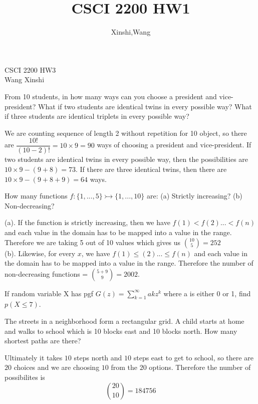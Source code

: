 \documentclass{article}
\title{CSCI 2200 HW1}
\author{Xinshi,Wang}
\begin{document}
\noindent
CSCI 2200 HW3\\
Wang Xinshi\\

\begin{addmargin}[2em]{2em}
	From 10 students, in how many ways can you choose a president and vice-president? What if two students are identical twins in every possible way? What if three students are identical triplets in every possible way?
	\vspace{1.5em}
	
	We are counting sequence of length 2 without repetition for 10 object, so there are $\dfrac{10!}{(10-2)!} = 10 \times 9 = 90$ ways of choosing a president and vice-president. If two students are identical twins in every possible way, then the possibilities are $10 \times 9 - (9+8) = 73$. If there are three identical twins, then there are $10 \times 9 - (9+8+9) = 64 $ ways. 
\end{addmargin}

\clearpage

\begin{addmargin}[2em]{2em}
	 How many functions $f : \{1, . . . , 5\} \rightarrowtail \{1, . . . , 10\}$ are: (a) Strictly increasing? (b) Non-decreasing?
	\vspace{1.5em}
	
	(a). If the function is strictly increasing, then we have $f(1)<f(2)...<f(n)$ and each value in the domain has to be mapped into a value in the range. Therefore we are taking 5 out of 10 values which gives us $\binom{10}{5} = 252$\\
	\indent	(b). Likewise, for every $x$,  we have $f(1)\leq(2)...\leq f(n)$ and each value in the domain has to be mapped into a value in the range. Therefore the number of non-decreasing functions = $\binom{5+9}{9} = 2002$.\\
\end{addmargin}

If random variable X has pgf $G(z) = \sum_{k=1}^{\infty} akz^k$ where a is either 0 or 1, find $p({X \leq 7})$.
\clearpage

\begin{addmargin}[2em]{2em}
The streets in a neighborhood form a rectangular grid. A child starts at home and walks to school which is 10 blocks east and 10 blocks north. How many shortest paths are there?
\vspace{1.5em}

Ultimately it takes $10$ steps north and $10$ steps east to get to school, so there are $20$ choices and we are choosing $10$ from the $20$ options. Therefore the number of possibilites is $$\binom{20}{10} = 184756$$
\end{addmargin}
\end{document}
